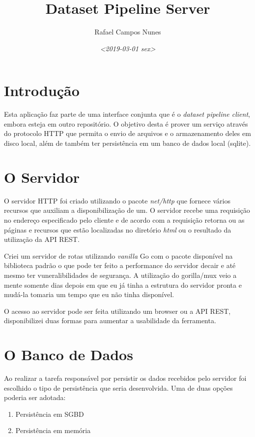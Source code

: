 \documentclass[a4paper, 12pt]{article}
\author{Rafael Campos Nunes}
\date{\textit{<2019-03-01 sex>}}
\title{Dataset Pipeline Server}
\begin{document}
\maketitle
\tableofcontents


\section{Introdução}
\label{sec:orgb461cda}

Esta aplicação faz parte de uma interface conjunta que é o \emph{dataset pipeline
client}, embora esteja em outro repositório. O objetivo desta é prover um
serviço através do protocolo HTTP que permita o envio de arquivos e o
armazenamento deles em disco local, além de também ter persistência em um banco
de dados local (sqlite).

\section{O Servidor}
\label{sec:org7072890}

O servidor HTTP foi criado utilizando o pacote \emph{net/http} que fornece vários
recursos que auxiliam a disponibilização de um. O servidor recebe uma requisição
no endereço especificado pelo cliente e de acordo com a requisição retorna ou as
páginas e recursos que estão localizadas no diretório \emph{html} ou o resultado da
utilização da API REST.

Criei um servidor de rotas utilizando \emph{vanilla} Go com o pacote disponível na
biblioteca padrão o que pode ter feito a performance do servidor decair e até
mesmo ter vuneralibilidades de segurança. A utilização do gorilla/mux veio a
mente somente dias depois em que eu já tinha a estrutura do servidor pronta e
mudá-la tomaria um tempo que eu não tinha disponível.

O acesso ao servidor pode ser feita utilizando um browser ou a API REST,
disponibilizei duas formas para aumentar a usabilidade da ferramenta.

\section{O Banco de Dados}
\label{sec:orgcfb12c7}

Ao realizar a tarefa responsável por persistir os dados recebidos pelo servidor
foi escolhido o tipo de persistência que seria desenvolvida. Uma de duas opções
poderia ser adotada:

\begin{enumerate}
\item Persistência em SGBD
\item Persistência em memória
\end{enumerate}
\end{document}
